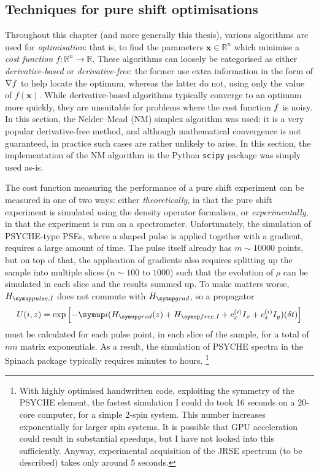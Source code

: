 \subsection{Techniques for pure shift optimisations}
\label{subsec:pureshift__optim_techniques}

Throughout this chapter (and more generally this thesis), various algorithms are used for \textit{optimisation}: that is, to find the parameters $\symbf{x} \in \mathbb{R}^n$ which minimise a \textit{cost function} $f : \mathbb{R}^n \to \mathbb{R}$.
These algorithms can loosely be categorised as either \textit{derivative-based} or \textit{derivative-free}: the former use extra information in the form of $\nabla f\/$ to help locate the optimum, whereas the latter do not, using only the value of $f(\symbf{x})$.
While derivative-based algorithms typically converge to an optimum more quickly, they are unsuitable for problems where the cost function $f\/$ is noisy.
In this section, the Nelder--Mead (NM) simplex algorithm\autocite{Nelder1965TCJ} was used: it is a very popular derivative-free method, and although mathematical convergence is not guaranteed\autocite{McKinnon1998SIAMJO}, in practice such cases are rather unlikely to arise.
In this section, the implementation of the NM algorithm in the Python \texttt{scipy} package was simply used as-is.

The cost function measuring the performance of a pure shift experiment can be measured in one of two ways: either \textit{theoretically}, in that the pure shift experiment is simulated using the density operator formalism, or \textit{experimentally}, in that the experiment is run on a spectrometer.
Unfortunately, the simulation of PSYCHE-type PSEs, where a shaped pulse is applied together with a gradient, requires a large amount of time.
The pulse itself already has $m \sim 10000$ points, but on top of that, the application of gradients also requires splitting up the sample into multiple slices ($n \sim 100$ to $1000$) such that the evolution of $\rho$ can be simulated in each slice and the results summed up.
To make matters worse, $\HpulseI$ does not commute with $\Hgrad$, so a propagator
\begin{equation}
    \label{eq:pulse_gradient_propagator}
    U(i, z) = \exp\left[-\mi(\Hgrad(z) + \HfreeI + c_x^{(i)}I_x + c_x^{(i)} I_y)(\delta t)\right]
\end{equation}
must be calculated for each pulse point, in each slice of the sample, for a total of $mn$ matrix exponentials.
As a result, the simulation of PSYCHE spectra in the Spinach package\autocite{Hogben2011JMR} typically requires minutes to hours.%
\footnote{With highly optimised handwritten code, exploiting the symmetry of the PSYCHE element, the fastest simulation I could do took 16 seconds on a 20-core computer, for a simple 2-spin system. This number increases exponentially for larger spin systems. It is possible that GPU acceleration could result in substantial speedups, but I have not looked into this sufficiently. Anyway, experimental acquisition of the JRSE spectrum (to be described) takes only around 5 seconds.}

